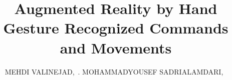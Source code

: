 \documentclass[journal]{IEEEtran}
\begin{document}
%
\title{Augmented Reality by Hand Gesture Recognized Commands and Movements}
%
%
%

\author{MEHDI VALINEJAD,~.
MOHAMMADYOUSEF SADRIALAMDARI,~%
}

% 
%
\end{document}
